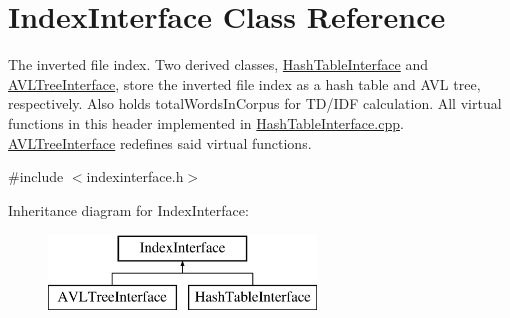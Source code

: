 \hypertarget{class_index_interface}{}\section{Index\+Interface Class Reference}
\label{class_index_interface}


The inverted file index. Two derived classes, \hyperlink{class_hash_table_interface}{Hash\+Table\+Interface} and \hyperlink{class_a_v_l_tree_interface}{A\+V\+L\+Tree\+Interface}, store the inverted file index as a hash table and A\+V\+L tree, respectively. Also holds total\+Words\+In\+Corpus for T\+D/\+I\+D\+F calculation. All virtual functions in this header implemented in \hyperlink{hashtableinterface_8cpp}{Hash\+Table\+Interface.\+cpp}. \hyperlink{class_a_v_l_tree_interface}{A\+V\+L\+Tree\+Interface} redefines said virtual functions.  




{\ttfamily \#include $<$indexinterface.\+h$>$}

Inheritance diagram for Index\+Interface\+:\begin{figure}[H]
\begin{center}
\leavevmode
\includegraphics[height=2.000000cm]{class_index_interface}
\end{center}
\end{figure}
